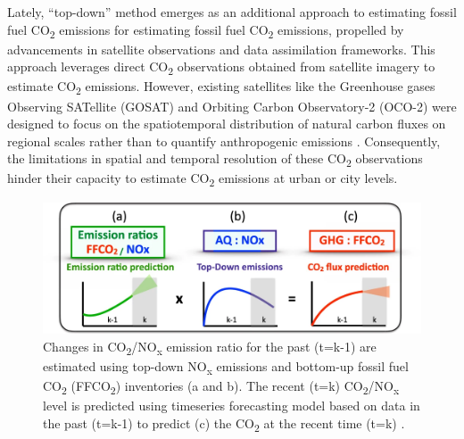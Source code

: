 Lately, “top-down” method emerges as an additional approach to estimating fossil fuel CO\textsubscript{2} emissions for estimating fossil fuel CO\textsubscript{2} emissions, propelled by advancements in satellite observations and data assimilation frameworks. This approach leverages direct CO\textsubscript{2} observations obtained from satellite imagery to estimate CO\textsubscript{2} emissions. However, existing satellites like the Greenhouse gases Observing SATellite (GOSAT) and Orbiting Carbon Observatory-2 (OCO-2) were designed to focus on the spatiotemporal distribution of natural carbon fluxes on regional scales rather than to quantify anthropogenic emissions \citep{nassar2017quantifying, yang2023using}. Consequently, the limitations in spatial and temporal resolution of these CO\textsubscript{2} observations hinder their capacity to estimate CO\textsubscript{2} emissions at urban or city levels. \par

\begin{figure}[tbh!]
    \centering
    \includegraphics[width=\textwidth]{figs/chap2/aq_nox_ratio.png}
    \caption[Fossil fuel CO\textsubscript{2} prediction from top-down NO\textsubscript{x}]{Changes in CO\textsubscript{2}/NO\textsubscript{x} emission ratio for the past (t=k-1) are estimated using top-down NO\textsubscript{x} emissions and bottom-up fossil fuel CO\textsubscript{2} (FFCO\textsubscript{2}) inventories (a and b). The recent (t=k) CO\textsubscript{2}/NO\textsubscript{x} level is predicted using timeseries forecasting model based on data in the past (t=k-1) to predict (c) the CO\textsubscript{2} at the recent time (t=k) \citep{miyazaki2023predictability}.}
    \label{fig:chap2_fig2}
\end{figure}

